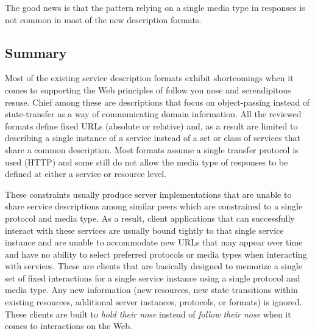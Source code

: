 \documentclass{wsrest2014}
\begin{document}
 \par{}The good news is that the pattern relying on a single media type in responses is not common in most of the new description formats.
\hypertarget{_summary_2}{}
\subsection{Summary}
\label{_summary_2}
 \par{}Most of the existing service description formats exhibit shortcomings when it comes to supporting the Web principles of \textquotedbl{}follow you nose\textquotedbl{} and \textquotedbl{}serendipitous resuse.\textquotedbl{} Chief among these are descriptions that focus on object-passing instead of state-transfer as a way of communicating domain information. All the reviewed formats define fixed URLs (absolute or relative) and, as a result are limited to describing a single instance of a service instead of a set or class of services that share a common description. Most formats assume a single transfer protocol is used (HTTP) and some still do not allow the media type of responses to be defined at either a service or resource level.
 \par{}These constraints usually produce server implementations that are unable to share service descriptions among similar peers which are constrained to a single protocol and media type. As a result, client applications that can successfully interact with these services are usually bound tightly to that single service instance and are unable to accommodate new URLs that may appear over time and have no ability to select preferred protocols or media types when interacting with services.  These are clients that are basically designed to memorize a single set of fixed interactions for a single service instance using a single protocol and media type. Any new information (new resources, new state transitions within existing resources, additional server instances, protocols, or formats) is ignored. These clients are built to \emph{hold their nose} instead of \emph{follow their nose} when it comes to interactions on the Web.
\hypertarget{_toward_a_new_service_description_format}{}
\end{document}

